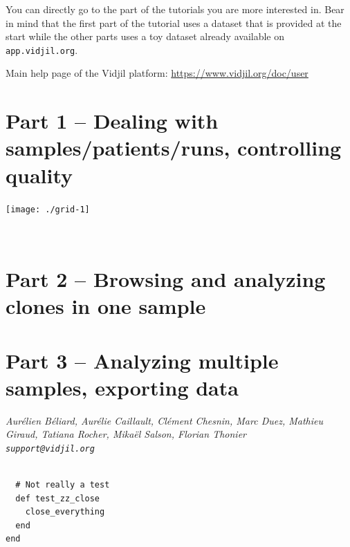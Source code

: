 \documentclass[11pt]{report}
\begin{document}
You can directly go to the part of the tutorials you are more interested in.
Bear in mind
that the first part of the tutorial uses a dataset that is
provided at the start
while the other parts uses a toy dataset
already available on \texttt{app.vidjil.org}.

Main help page of the Vidjil
platform: \url{https://www.vidjil.org/doc/user}


\tableofcontents


\chapter{Part 1 -- Dealing with samples/patients/runs, controlling quality
}




\bigskip


\vfill

\centerline{\texttt{[image: ./grid-1]}}

\vfill

\newpage ~
\newpage

\chapter{Part 2 --  Browsing and analyzing clones in one sample}

\bigskip







\chapter{Part 3 -- Analyzing multiple samples, exporting data}





\vfill
\flushright \it Aurélien Béliard, Aurélie Caillault, Clément Chesnin, Marc Duez, Mathieu Giraud, Tatiana Rocher, Mikaël Salson, Florian Thonier
\\ \texttt{support@vidjil.org}


\begin{verbatim}

  # Not really a test
  def test_zz_close
    close_everything
  end
end
\end{verbatim}
\end{document}
